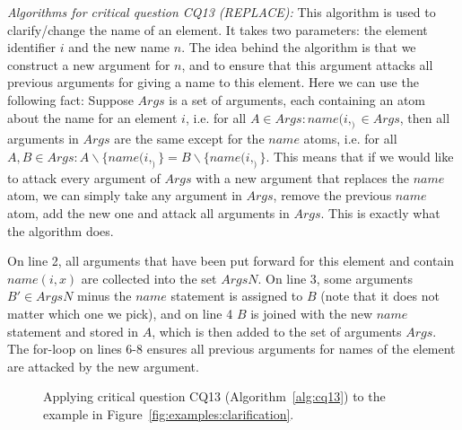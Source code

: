 \emph{Algorithms for critical question CQ13 (REPLACE):} This algorithm is used to clarify/change the name of an element. It takes two parameters: the element identifier $i$ and the new name $n$. The idea behind the algorithm is that we construct a new argument for $n$, and to ensure that this argument attacks all previous arguments for giving a name to this element. Here we can use the following fact: Suppose $Args$ is a set of arguments, each containing an atom about the name for an element $i$, i.e. for all $A\in Args: name(i,_)\in Args$, then all arguments in $Args$ are the same except for the $name$ atoms, i.e. for all $A,B\in Args: A\backslash\{name(i,_)\} = B\backslash\{name(i,_)\}$. This means that if we would like to attack every argument of $Args$ with a new argument that replaces the $name$ atom, we can simply take any argument in $Args$, remove the previous $name$ atom, add the new one and attack all arguments in $Args$. This is exactly what the algorithm does.


On line 2, all arguments that have been put forward for this element and contain $name(i,x)$ are collected into the set $ArgsN$. On line 3, some arguments $B'\in ArgsN$ minus the $name$ statement is assigned to $B$ (note that it does not matter which one we pick), and on line 4 $B$ is joined with the new $name$ statement and stored in $A$, which is then added to the set of arguments $Args$. The for-loop on lines 6-8 ensures all previous arguments for names of the element are attacked by the new argument.

\begin{figure}[ht!]
\centering
\caption{Applying critical question CQ13 (Algorithm~\ref{alg:cq13}) to the example in Figure~\ref{fig:examples:clarification}.}
\label{fig:examples:clarification:formal}
\end{figure} 

